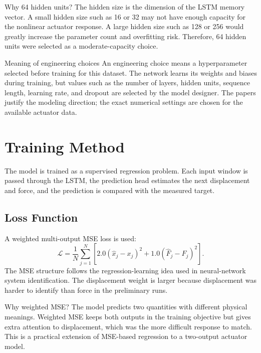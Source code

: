 \documentclass[11pt]{article}
\begin{document}
\begin{archbox}{Why 64 hidden units?}
The hidden size is the dimension of the LSTM memory vector. A small hidden size such as 16 or 32 may not have enough capacity for the nonlinear actuator response. A large hidden size such as 128 or 256 would greatly increase the parameter count and overfitting risk. Therefore, 64 hidden units were selected as a moderate-capacity choice.
\end{archbox}

\begin{summarybox}{Meaning of engineering choices}
An engineering choice means a hyperparameter selected before training for this dataset. The network learns its weights and biases during training, but values such as the number of layers, hidden units, sequence length, learning rate, and dropout are selected by the model designer. The papers justify the modeling direction; the exact numerical settings are chosen for the available actuator data.
\end{summarybox}

\section{Training Method}
The model is trained as a supervised regression problem. Each input window is passed through the LSTM, the prediction head estimates the next displacement and force, and the prediction is compared with the measured target.

\subsection{Loss Function}
A weighted multi-output MSE loss is used:
\begin{equation}
\mathcal{L}=\frac{1}{N}\sum_{j=1}^{N}\left[2.0(\hat{x}_j-x_j)^2+1.0(\hat{F}_j-F_j)^2\right].
\end{equation}
The MSE structure follows the regression-learning idea used in neural-network system identification. The displacement weight is larger because displacement was harder to identify than force in the preliminary runs.

\begin{trainbox}{Why weighted MSE?}
The model predicts two quantities with different physical meanings. Weighted MSE keeps both outputs in the training objective but gives extra attention to displacement, which was the more difficult response to match. This is a practical extension of MSE-based regression to a two-output actuator model.
\end{trainbox}
\end{document}
